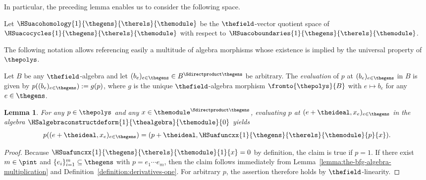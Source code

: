 \documentclass[pdftex]{sigma}
\numberwithin{equation}{section}
\newtheorem{Lemma}[Theorem]{Lemma}
\begin{document}
{In particular, the preceding lemma enables us to consider the following space.
\begin{Definition}
  \label{definition:hochschild-particular-one-cohomology}
  Let $\HSuacohomology{1}{\thegens}{\therels}{\themodule}$ be the $\thefield$-vector quotient space of $\HSuacocycles{1}{\thegens}{\therels}{\themodule}$ with respect to $\HSuacoboundaries{1}{\thegens}{\therels}{\themodule}$.
\end{Definition}
  The following notation allows referencing easily a multitude of algebra morphisms whose existence is implied by the universal property of $\thepolys$.
\begin{Notation}
  \label{notation:evaluation_of_polynomials}
  \newcommand{\anyalgebra}{B}
  \newcommand{\anytuple}{b}
  \newcommand{\anygen}{e}
  \newcommand{\anytuplex}[1]{\anytuple_{#1}}
  \newcommand{\anypoly}{p}
  \newcommand{\themorph}{g}
  Let  $\anyalgebra$ be any $\thefield$-algebra and let $(\anytuplex{\anygen})_{\anygen\in\thegens}\in \anyalgebra^{\Sdirectproduct \thegens}$ be arbitrary. The \emph{evaluation} of $\anypoly$ at $(\anytuplex{\anygen})_{\anygen\in\thegens}$ in $\anyalgebra$ is given by $\anypoly((\anytuplex{\anygen})_{\anygen\in\thegens}):= \themorph(\anypoly)$, where  $\themorph$ is the unique $\thefield$-algebra morphism  $\fromto{\thepolys}{\anyalgebra}$ with  $\anygen\mapsto\anytuplex{\anygen}$ for any $\anygen\in\thegens$.
\end{Notation}
{
        \newcommand{\somepoly}{p}
        \newcommand{\somegen}{e}
        \newcommand{\thetuple}{x}
        \newcommand{\thetuplex}[1]{\thetuple_{#1}}
  \begin{Lemma}
    \label{lemma:hochschild-particular-one-cohomology-helper}
      {
        For any $\somepoly\in\thepolys$ and any $\thetuple\in \themodule^{\Sdirectproduct \thegens}$, evaluating $\somepoly$ at $(\somegen+\theideal,\thetuplex{\somegen})_{\somegen\in\thegens}$ in the algebra $\HSalgebraconstructdeform{1}{\thealgebra}{\themodule}{0}$ yields
        \[
          \somepoly((\somegen+\theideal,\thetuplex{\somegen})_{\somegen\in\thegens})=(\somepoly+\theideal,\HSuafuncxx{1}{\thegens}{\therels}{\themodule}{\somepoly}{\thetuple}).
        \]
        }
  \end{Lemma}
  \begin{proof}
    \newcommand{\somenumber}{m}
    \newcommand{\indi}{i}
    \newcommand{\thee}[1]{e_{#1}}
Because $\HSuafuncxx{1}{\thegens}{\therels}{\themodule}{1}{\thetuple}=0$ by definition, the claim is true if $\somepoly=1$. If there exist $\somenumber\in\pint$ and $\{\thee{\indi}\}_{\indi=1}^\somenumber\subseteq \thegens$ with $\somepoly=\thee{1}\cdots\thee{\somenumber}$, then the claim follows immediately from Lem\-ma~\ref{lemma:the-bfg-algebra-multiplication} and Definition~\ref{definition:derivatives-one}. For arbitrary $\somepoly$, the assertion therefore holds by $\thefield$-linearity.
  \end{proof}
}

}
\end{document}
